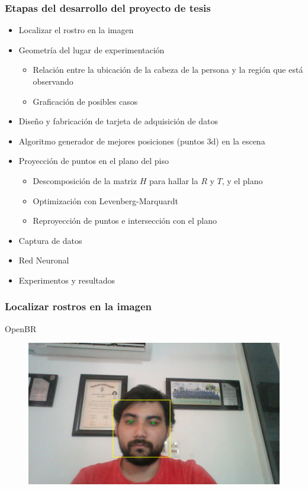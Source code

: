 \documentclass[10pt, compress]{beamer}
\begin{document}
\begin{frame}[fragile]
	\frametitle{Etapas del desarrollo del proyecto de tesis}
	\begin{itemize}
		\item Localizar el rostro en la imagen
		\item Geometría del lugar de experimentación
			\begin{itemize}
				\item Relación entre la ubicación de la cabeza de la persona y la región que está observando
				\item Graficación de posibles casos
	 	 	\end{itemize}
	 	 \item Diseño y fabricación de tarjeta de adquisición de datos
	 	 \item Algoritmo generador de mejores posiciones (puntos 3d) en la escena
	 	 \item Proyección de puntos en el plano del piso
	 	 	\begin{itemize}
	 	 		\item Descomposición de la matriz $H$ para hallar la $R$ y $T$, y el plano
	 	 		\item Optimización con Levenberg-Marquardt
	 	 		\item Reproyección de puntos e intersección con el plano
	 	 	\end{itemize}
	 	 
	 	 \item Captura de datos
	 	 \item Red Neuronal
	 	 \item Experimentos y resultados
 	 	
 	\end{itemize}
\end{frame}

\begin{frame}[fragile]
	\frametitle{Localizar rostros en la imagen}
	OpenBR
	\begin{figure}[htbp]
		\centering
		\includegraphics[width=.7\textwidth]{./pictures/detector}
	\end{figure}
\end{frame}
\end{document}
